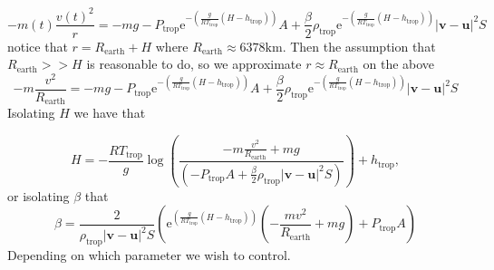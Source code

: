 \documentclass{article}
\renewcommand{\vec}[1]{\boldsymbol{#1}}
\begin{document}
\begin{equation}
     -m(t)\frac{v(t)^2}{r}=-mg-  P_{\text{trop}}\mathrm{e}^{-\left( \frac{g}{RT_{\text{trop}}}(H-h_{\text{trop}}) \right)}A +\frac{\beta }{2} \rho_{\text{trop}}\mathrm{e}^{-\left( \frac{g}{RT_{\text{trop}}}(H-h_{\text{trop}}) \right)} |\vec{v}- \vec{u}|^2S
   \end{equation}
notice that $r=R_{\text{earth}}+H$ where $R_{\text{earth}}\approx 6378\text{km}$. Then the assumption that $R_{\text{earth}}>> H$ is reasonable to do, so we approximate $r\approx R_{\text{earth}}$ on the above 
\begin{equation}
    -m\frac{v^2}{R_{\text{earth}}}= -mg-  P_{\text{trop}}\mathrm{e}^{-\left( \frac{g}{RT_{\text{trop}}}(H-h_{\text{trop}}) \right)}A +\frac{\beta }{2} \rho_{\text{trop}}\mathrm{e}^{-\left( \frac{g}{RT_{\text{trop}}}(H-h_{\text{trop}}) \right)} |\vec{v}- \vec{u}|^2S
\end{equation}
Isolating $H$  we have that


\begin{equation}
    H= - \frac{RT_{\text{trop}}}{g}\log \left(\frac{-m\frac{v^2}{R_{\text{earth}}} +mg}{\left(-  P_{\text{trop}}A +\frac{\beta }{2} \rho_{\text{trop}} |\vec{v}- \vec{u}|^2S\right)}\right)+h_{\text{trop}},
\end{equation}
or isolating $\beta$ that
\begin{equation}
\beta=    \frac{2}{\rho_{\text{trop}}|\vec{v}- \vec{u}|^2S} \left( \mathrm{e}^{\left( \frac{g}{RT_{\text{trop}}}(H-h_{\text{trop}}) \right)} \left( -\frac{m v^2}{R_{\text{earth}}}+mg\right) + P_{\text{trop}}A  \right)
\end{equation}
Depending on which parameter we wish to control. 
\end{document}
